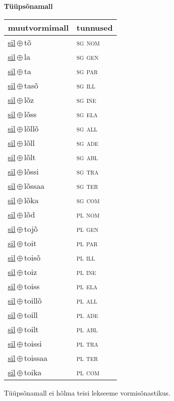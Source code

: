 

\vspace{3.5em}
\noindent \begin{minipage}{\textwidth}
\noindent \textbf{Tüüpsõnamall \,}\\

\begin{sideways}
\begin{tabular}{l l}
muutvormimall & tunnused \\
\hline
\underline{sil}\,$\oplus$\,tõ & \textsc{ sg nom } \\
\underline{sil}\,$\oplus$\,la & \textsc{ sg gen } \\
\underline{sil}\,$\oplus$\,ta & \textsc{ sg par } \\
\underline{sil}\,$\oplus$\,tasõ & \textsc{ sg ill } \\
\underline{sil}\,$\oplus$\,lõz & \textsc{ sg ine } \\
\underline{sil}\,$\oplus$\,lõss & \textsc{ sg ela } \\
\underline{sil}\,$\oplus$\,lõllõ & \textsc{ sg all } \\
\underline{sil}\,$\oplus$\,lõll & \textsc{ sg ade } \\
\underline{sil}\,$\oplus$\,lõlt & \textsc{ sg abl } \\
\underline{sil}\,$\oplus$\,lõssi & \textsc{ sg tra } \\
\underline{sil}\,$\oplus$\,lõssaa & \textsc{ sg ter } \\
\underline{sil}\,$\oplus$\,lõka & \textsc{ sg com } \\
\underline{sil}\,$\oplus$\,lõd & \textsc{ pl nom } \\
\underline{sil}\,$\oplus$\,tojõ & \textsc{ pl gen } \\
\underline{sil}\,$\oplus$\,toit & \textsc{ pl par } \\
\underline{sil}\,$\oplus$\,toisõ & \textsc{ pl ill } \\
\underline{sil}\,$\oplus$\,toiz & \textsc{ pl ine } \\
\underline{sil}\,$\oplus$\,toiss & \textsc{ pl ela } \\
\underline{sil}\,$\oplus$\,toillõ & \textsc{ pl all } \\
\underline{sil}\,$\oplus$\,toill & \textsc{ pl ade } \\
\underline{sil}\,$\oplus$\,toilt & \textsc{ pl abl } \\
\underline{sil}\,$\oplus$\,toissi & \textsc{ pl tra } \\
\underline{sil}\,$\oplus$\,toissaa & \textsc{ pl ter } \\
\underline{sil}\,$\oplus$\,toika & \textsc{ pl com } \\
\end{tabular}
\end{sideways}
\label{tab:tüüpsõnamall-siltõ}

\end{minipage}

 
\vspace{1em}
\noindent Tüüpsõnamall  ei hõlma teisi lekseeme vormi\-sõnastikus.
